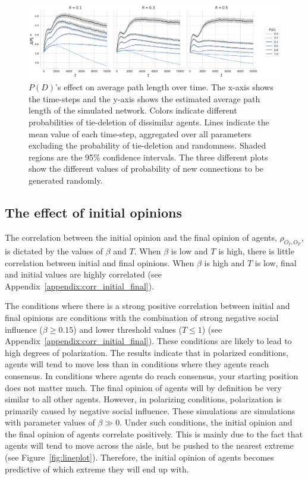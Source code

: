 \documentclass[11pt]{article}
\begin{document}
\begin{figure}[H]
    \centering
    \includegraphics[width=.98\linewidth]{../plots/overall/Average_Path_Length_Ties_Deleted.png}
  \caption{$P(D)$'s effect on average path length over time. The x-axis shows the time-steps and the y-axis shows the estimated average path length of the simulated network. Colors indicate different probabilities of tie-deletion of dissimilar agents. Lines indicate the mean value of each time-step, aggregated over all parameters excluding the probability of tie-deletion and randomness. Shaded regions are the 95\% confidence intervals. The three different plots show the different values of probability of new connections to be generated randomly. }
  \label{appendix:apl}
\end{figure}

\subsection{The effect of initial opinions}
The correlation between the initial opinion and the final opinion of agents, $\rho_{O_I, O_F}$, is dictated by the values of $\beta$ and $T$. When $\beta$ is low and $T$ is high, there is little correlation between initial and final opinions. When $\beta$ is high and $T$ is low, final and initial values are highly correlated (see Appendix~\ref{appendix:corr_initial_final}).

The conditions where there is a strong positive correlation between initial and final opinions are conditions with the combination of strong negative social influence ($\beta \geq 0.15$) and lower threshold values ($T \leq 1$) (see Appendix~\ref{appendix:corr_initial_final}). These conditions are likely to lead to high degrees of polarization. The results indicate that in polarized conditions, agents will tend to move less than in conditions where they agents reach consensus. In conditions where agents do reach consensus, your starting position does not matter much. The final opinion of agents will by definition be very similar to all other agents. However, in polarizing conditions, polarization is primarily caused by negative social influence. These simulations are simulations with parameter values of $\beta \gg 0$. Under such conditions, the initial opinion and the final opinion of agents correlate positively. This is mainly due to the fact that agents will tend to move across the aisle, but be pushed to the nearest extreme (see Figure~\ref{fig:lineplot}). Therefore, the initial opinion of agents becomes predictive of which extreme they will end up with. 
\end{document}
